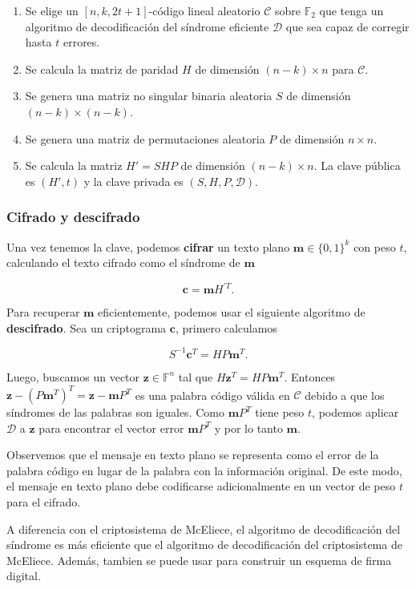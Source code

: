 \begin{enumerate}
    \item Se elige un $[n, k, 2t + 1]$-código lineal aleatorio $\mathcal{C}$ sobre $\mathbb{F}_2$ que tenga un algoritmo de decodificación del síndrome eficiente $\mathcal{D}$ que sea capaz de corregir hasta $t$ errores.
    \item Se calcula la matriz de paridad $H$ de dimensión $(n - k) \times n$ para $\mathcal{C}$.
    \item Se genera una matriz no singular binaria aleatoria $S$ de dimensión $(n - k) \times (n - k)$.
    \item Se genera una matriz de permutaciones aleatoria $P$ de dimensión $n \times n$.
    \item Se calcula la matriz $H' = SHP$ de dimensión $(n - k) \times n$. La clave pública es $(H', t)$ y la clave privada es $(S, H, P, \mathcal{D})$.
\end{enumerate}

\subsubsection{Cifrado y descifrado}

Una vez tenemos la clave, podemos \textbf{cifrar} un texto plano $\textbf{m} \in \{ 0, 1 \}^k$ con peso $t$, calculando el texto cifrado como el síndrome de $\textbf{m}$

$$\textbf{c} = \textbf{m} H^{'T}.$$

Para recuperar $\textbf{m}$ eficientemente, podemos usar el siguiente algoritmo de \textbf{descifrado}. Sea un criptograma $\textbf{c}$, primero calculamos

$$S^{-1} \textbf{c}^T = H P \textbf{m}^T.$$

Luego, buscamos un vector $\textbf{z} \in \mathbb{F}^n$ tal que $H \textbf{z}^T = HP \textbf{m}^T$. Entonces $\textbf{z} - (P\textbf{m}^T)^T = \textbf{z} - \textbf{m}P^T$ es una palabra código válida en $\mathcal{C}$ debido a que los síndromes de las palabras son iguales. Como $\textbf{m}P^T$ tiene peso $t$, podemos aplicar $\mathcal{D}$ a $\textbf{z}$ para encontrar el vector error $\textbf{m}P^T$ y por lo tanto $\textbf{m}$.

Observemos que el mensaje en texto plano se representa como el error de la palabra código en lugar de la palabra con la información original. De este modo, el mensaje en texto plano debe codificarse adicionalmente en un vector de peso $t$ para el cifrado.

A diferencia con el criptosistema de McEliece, el algoritmo de decodificación del síndrome es más eficiente que el algoritmo de decodificación del criptosistema de McEliece. Además, tambien se puede usar para construir un esquema de firma digital.

